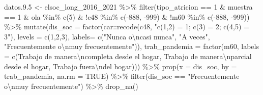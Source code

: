 \documentclass[
  12pt,
]{book}
\newenvironment{Shaded}{\begin{snugshade}}{\end{snugshade}}
\newcommand{\AttributeTok}[1]{\textcolor[rgb]{0.77,0.63,0.00}{#1}}
\newcommand{\ConstantTok}[1]{\textcolor[rgb]{0.00,0.00,0.00}{#1}}
\newcommand{\DecValTok}[1]{\textcolor[rgb]{0.00,0.00,0.81}{#1}}
\newcommand{\FloatTok}[1]{\textcolor[rgb]{0.00,0.00,0.81}{#1}}
\newcommand{\FunctionTok}[1]{\textcolor[rgb]{0.00,0.00,0.00}{#1}}
\newcommand{\NormalTok}[1]{#1}
\newcommand{\OtherTok}[1]{\textcolor[rgb]{0.56,0.35,0.01}{#1}}
\newcommand{\SpecialCharTok}[1]{\textcolor[rgb]{0.00,0.00,0.00}{#1}}
\newcommand{\StringTok}[1]{\textcolor[rgb]{0.31,0.60,0.02}{#1}}
\begin{document}
\begin{Shaded}
\begin{Highlighting}[]
\NormalTok{datos.}\FloatTok{9.5} \OtherTok{\textless{}{-}}\NormalTok{ elsoc\_long\_2016\_2021 }\SpecialCharTok{\%\textgreater{}\%} 
  \FunctionTok{filter}\NormalTok{(tipo\_atricion }\SpecialCharTok{==} \DecValTok{1} \SpecialCharTok{\&}\NormalTok{ muestra }\SpecialCharTok{==} \DecValTok{1} \SpecialCharTok{\&}\NormalTok{ ola }\SpecialCharTok{\%in\%} \FunctionTok{c}\NormalTok{(}\DecValTok{5}\NormalTok{) }\SpecialCharTok{\&} \SpecialCharTok{!}\NormalTok{c48 }\SpecialCharTok{\%in\%} \FunctionTok{c}\NormalTok{(}\SpecialCharTok{{-}}\DecValTok{888}\NormalTok{, }\SpecialCharTok{{-}}\DecValTok{999}\NormalTok{) }\SpecialCharTok{\&} \SpecialCharTok{!}\NormalTok{m60 }\SpecialCharTok{\%in\%} \FunctionTok{c}\NormalTok{(}\SpecialCharTok{{-}}\DecValTok{888}\NormalTok{, }\SpecialCharTok{{-}}\DecValTok{999}\NormalTok{)) }\SpecialCharTok{\%\textgreater{}\%} 
  \FunctionTok{mutate}\NormalTok{(}\AttributeTok{dis\_soc =} \FunctionTok{factor}\NormalTok{(car}\SpecialCharTok{::}\FunctionTok{recode}\NormalTok{(c48, }\StringTok{"c(1,2) = 1; c(3) = 2; c(4,5) = 3"}\NormalTok{),}
                               \AttributeTok{levels =} \FunctionTok{c}\NormalTok{(}\DecValTok{1}\NormalTok{,}\DecValTok{2}\NormalTok{,}\DecValTok{3}\NormalTok{),}
                               \AttributeTok{labels=} \FunctionTok{c}\NormalTok{(}\StringTok{"Nunca o}\SpecialCharTok{\textbackslash{}n}\StringTok{casi nunca"}\NormalTok{, }\StringTok{"A veces"}\NormalTok{,}
                                         \StringTok{"Frecuentemente o}\SpecialCharTok{\textbackslash{}n}\StringTok{muy frecuentemente"}\NormalTok{)),}
         \AttributeTok{trab\_pandemia =} \FunctionTok{factor}\NormalTok{(m60, }\AttributeTok{labels =} \FunctionTok{c}\NormalTok{(}\StringTok{\textquotesingle{}Trabajo de manera}\SpecialCharTok{\textbackslash{}n}\StringTok{completa desde el hogar\textquotesingle{}}\NormalTok{,}
                                                \StringTok{\textquotesingle{}Trabajo de manera}\SpecialCharTok{\textbackslash{}n}\StringTok{parcial desde el hogar\textquotesingle{}}\NormalTok{,}
                                                \StringTok{\textquotesingle{}Trabajo fuera}\SpecialCharTok{\textbackslash{}n}\StringTok{del hogar\textquotesingle{}}\NormalTok{))) }\SpecialCharTok{\%\textgreater{}\%}
  \FunctionTok{prop}\NormalTok{(}\AttributeTok{x =}\NormalTok{ dis\_soc, }\AttributeTok{by =}\NormalTok{ trab\_pandemia, }\AttributeTok{na.rm =} \ConstantTok{TRUE}\NormalTok{) }\SpecialCharTok{\%\textgreater{}\%} 
  \FunctionTok{filter}\NormalTok{(dis\_soc }\SpecialCharTok{==} \StringTok{"Frecuentemente o}\SpecialCharTok{\textbackslash{}n}\StringTok{muy frecuentemente"}\NormalTok{) }\SpecialCharTok{\%\textgreater{}\%} 
  \FunctionTok{drop\_na}\NormalTok{()}


\end{Highlighting}
\end{Shaded}
\end{document}
